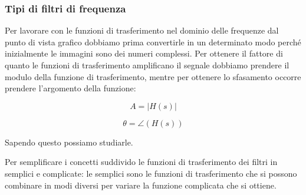 \documentclass[a4paper, 10pt, final]{article} %
\begin{document}
    \subsubsection{Tipi di filtri di frequenza}
    Per lavorare con le funzioni di trasferimento nel dominio delle frequenze dal punto di vista grafico dobbiamo prima convertirle in un determinato modo perch\'{e} inizialmente le immagini sono dei numeri complessi.
    Per ottenere il fattore di quanto le funzioni di trasferimento amplificano il segnale dobbiamo prendere il modulo della funzione di trasferimento, mentre per ottenere lo sfasamento occorre prendere l'argomento della funzione:
    \begin{figure}[H]
        \centering
        \begin{minipage}[b]{.31\linewidth}
            \centering
            \begin{equation*}
                A = \left|H(s)\right|
            \end{equation*}
        \end{minipage}
        \hspace{0.04\linewidth}
        \begin{minipage}[b]{.31\linewidth}
            \centering
            \begin{equation*}
                \theta = \angle\left(H(s)\right)
            \end{equation*}
        \end{minipage}
    \end{figure}
    \noindent Sapendo questo possiamo studiarle.

    Per semplificare i concetti suddivido le funzioni di trasferimento dei filtri in semplici e complicate: le semplici sono le funzioni di trasferimento che si possono combinare in modi diversi per variare la funzione complicata che si ottiene.
    
\end{document}
